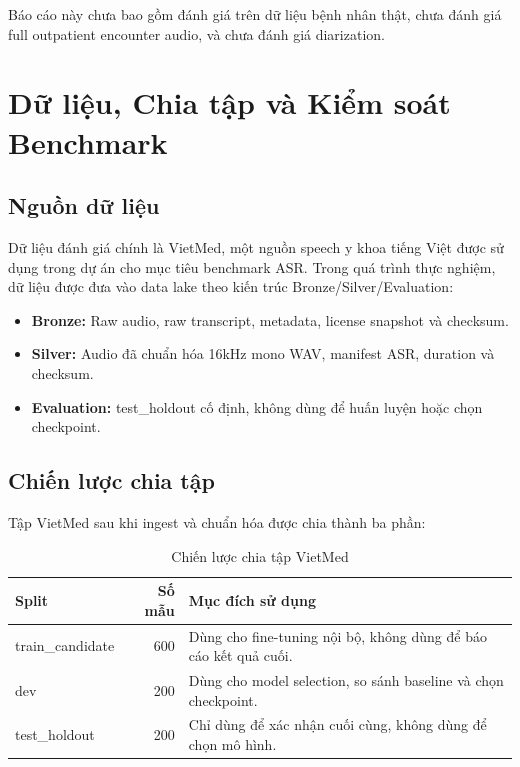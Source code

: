 \documentclass[12pt,a4paper]{article}
\begin{document}
Báo cáo này chưa bao gồm đánh giá trên dữ liệu bệnh nhân thật, chưa đánh giá full outpatient encounter audio, và chưa đánh giá diarization.

\section{Dữ liệu, Chia tập và Kiểm soát Benchmark}

\subsection{Nguồn dữ liệu}

Dữ liệu đánh giá chính là VietMed, một nguồn speech y khoa tiếng Việt được sử dụng trong dự án cho mục tiêu benchmark ASR. Trong quá trình thực nghiệm, dữ liệu được đưa vào data lake theo kiến trúc Bronze/Silver/Evaluation:
\begin{itemize}[leftmargin=1.2cm]
    \item \textbf{Bronze:} Raw audio, raw transcript, metadata, license snapshot và checksum.
    \item \textbf{Silver:} Audio đã chuẩn hóa 16kHz mono WAV, manifest ASR, duration và checksum.
    \item \textbf{Evaluation:} test\_holdout cố định, không dùng để huấn luyện hoặc chọn checkpoint.
\end{itemize}

\subsection{Chiến lược chia tập}

Tập VietMed sau khi ingest và chuẩn hóa được chia thành ba phần:

\begin{table}[h]
\centering
\caption{Chiến lược chia tập VietMed}
\begin{tabularx}{\textwidth}{|l|r|X|}
\hline
\textbf{Split} & \textbf{Số mẫu} & \textbf{Mục đích sử dụng} \\
\hline
train\_candidate & 600 & Dùng cho fine-tuning nội bộ, không dùng để báo cáo kết quả cuối. \\
\hline
dev & 200 & Dùng cho model selection, so sánh baseline và chọn checkpoint. \\
\hline
test\_holdout & 200 & Chỉ dùng để xác nhận cuối cùng, không dùng để chọn mô hình. \\
\hline
\end{tabularx}
\end{table}
\end{document}
